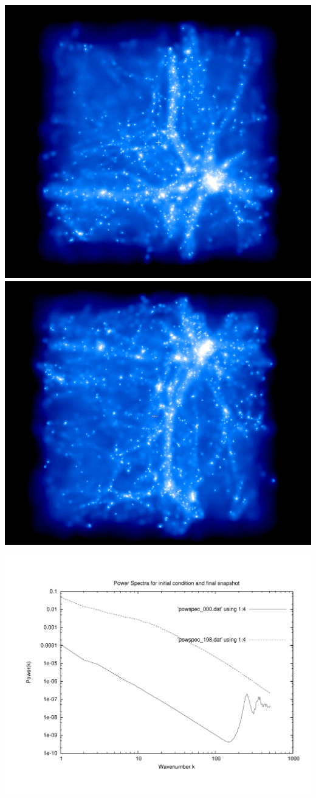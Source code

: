 \includegraphics[scale=0.2]{fuenfincr256_1/1.png} 
\includegraphics[scale=0.2]{fuenfincr256_1/2.png}

\includegraphics[scale=0.5]{fuenfincr256_1/plot_powspec_fuenfincr256_1}

